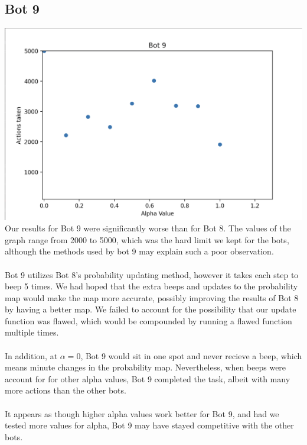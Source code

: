 \documentclass[12pt]{article}
\begin{document}
\subsection*{Bot 9}
\includegraphics*[scale=0.65]{Bot9}
Our results for Bot 9 were significantly worse than for Bot 8. The values of the graph range from 2000 to 5000, which 
was the hard limit we kept for the bots, although the methods used by bot 9 may explain such a poor observation. 
\\
\\
Bot 9 utilizes Bot 8's probability updating method, however it takes each step to beep 5 times. We had hoped that 
the extra beeps and updates to the probability map would make the map more accurate, possibly improving the results of Bot 8 by 
having a better map. We failed to account for the possibility that our update function was flawed, which would be 
compounded by running a flawed function multiple times. 
\\
\\
In addition, at $\alpha = 0$, Bot 9 would sit in one spot and never recieve a beep, 
which means minute changes in the probability map. Nevertheless, when beeps were account for 
for other alpha values, Bot 9 completed the task, albeit with many more actions than the other bots. 
\\
\\
It appears as though higher alpha values work better for Bot 9, and had we tested more 
values for alpha, Bot 9 may have stayed competitive with the other bots.
\end{document}
